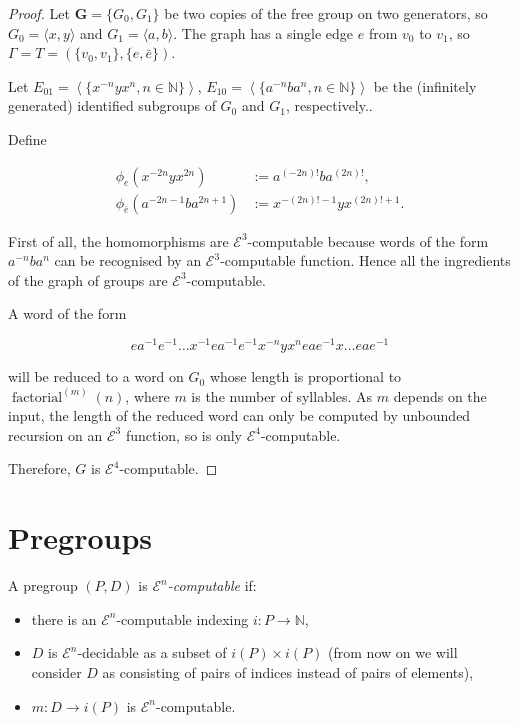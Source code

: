 \documentclass[a4paper]{article}
\newcommand{\grz}[1]{$\mathcal{E}^{#1}$}	%
\newcommand{\NN}{\mathbb{N}}	%
\theoremstyle{plain}
\theoremstyle{definition}
\begin{document}
\begin{proof}
Let $\mathbf{G} = \{G_0,G_1\}$ be two copies of the free group on two generators, so $G_0 = \langle x,y \rangle$ and $G_1 = \langle a,b \rangle$. The graph has a single edge $e$ from $v_0$ to $v_1$, so $\Gamma = T = (\{v_0,v_1\},\{e,\bar{e}\})$.

Let $E_{01} = \left \langle \{x^{-n}yx^n, n \in \mathbb{N} \} \right \rangle$, $E_{10} = \left\langle \{ a^{-n}ba^n, n \in \mathbb{N} \} \right\rangle$ be the (infinitely generated) identified subgroups of $G_0$ and $G_1$, respectively..

Define

\begin{align*} 
	\phi_{e}(x^{-2n}yx^{2n}) &:= a^{(-2n)!}ba^{(2n)!}, \\
	\phi_{\bar{e}}(a^{-2n-1}ba^{2n+1}) &:= x^{-(2n)!-1}yx^{(2n)!+1}. 
\end{align*} 

First of all, the homomorphisms are \grz{3}-computable because words of the form $a^{-n}ba^n$ can be recognised by an \grz{3}-computable function. Hence all the ingredients of the graph of groups are \grz{3}-computable.

A word of the form

\[ ea^{-1}e^{-1} \dots x^{-1}ea^{-1}e^{-1}x^{-n}yx^neae^{-1}x \dots eae^{-1} \]

will be reduced to a word on $G_0$ whose length is proportional to $\operatorname{factorial}^{(m)}(n)$, where $m$ is the number of syllables. As $m$ depends on the input, the length of the reduced word can only be computed by unbounded recursion on an \grz{3} function, so is only \grz{4}-computable.

Therefore, $G$ is \grz{4}-computable. 
\end{proof}

\section{Pregroups \label{pregroups}}

A pregroup $(P,D)$ is {\it \grz{n}-computable} if: 
\begin{itemize}
	\item there is an \grz{n}-computable indexing $i: P \rightarrow \NN$,
	\item  $D$ is \grz{n}-decidable as a subset of $i(P) \times i(P)$ (from now on we will consider $D$ as consisting of pairs of indices instead of pairs of elements),
	\item $m: D \rightarrow i(P)$ is \grz{n}-computable.
\end{itemize}
\end{document}
